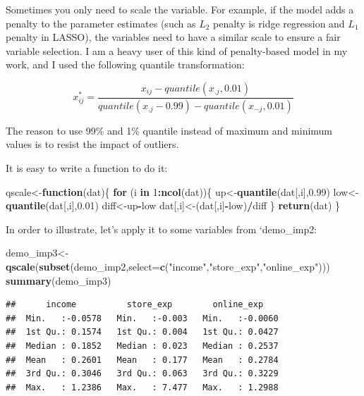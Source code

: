 \documentclass[12pt,]{krantz}
\newenvironment{Shaded}{\begin{snugshade}}{\end{snugshade}}
\newcommand{\KeywordTok}[1]{\textcolor[rgb]{0.13,0.29,0.53}{\textbf{#1}}}
\newcommand{\DataTypeTok}[1]{\textcolor[rgb]{0.13,0.29,0.53}{#1}}
\newcommand{\DecValTok}[1]{\textcolor[rgb]{0.00,0.00,0.81}{#1}}
\newcommand{\FloatTok}[1]{\textcolor[rgb]{0.00,0.00,0.81}{#1}}
\newcommand{\StringTok}[1]{\textcolor[rgb]{0.31,0.60,0.02}{#1}}
\newcommand{\ControlFlowTok}[1]{\textcolor[rgb]{0.13,0.29,0.53}{\textbf{#1}}}
\newcommand{\OperatorTok}[1]{\textcolor[rgb]{0.81,0.36,0.00}{\textbf{#1}}}
\newcommand{\NormalTok}[1]{#1}
\theoremstyle{definition}
\theoremstyle{definition}
\theoremstyle{definition}
\theoremstyle{remark}
\begin{document}
Sometimes you only need to scale the variable. For example, if the model
adds a penalty to the parameter estimates (such as \(L_2\) penalty is
ridge regression and \(L_1\) penalty in LASSO), the variables need to
have a similar scale to ensure a fair variable selection. I am a heavy
user of this kind of penalty-based model in my work, and I used the
following quantile transformation:

\[
x_{ij}^{*}=\frac{x_{ij}-quantile(x_{.j},0.01)}{quantile(x_{.j}-0.99)-quantile(x_{-j},0.01)}
\]

The reason to use 99\% and 1\% quantile instead of maximum and minimum
values is to resist the impact of outliers.

It is easy to write a function to do it:

\begin{Shaded}
\begin{Highlighting}[]
\NormalTok{qscale<-}\ControlFlowTok{function}\NormalTok{(dat)\{}
  \ControlFlowTok{for}\NormalTok{ (i }\ControlFlowTok{in} \DecValTok{1}\OperatorTok{:}\KeywordTok{ncol}\NormalTok{(dat))\{}
\NormalTok{    up<-}\KeywordTok{quantile}\NormalTok{(dat[,i],}\FloatTok{0.99}\NormalTok{)}
\NormalTok{    low<-}\KeywordTok{quantile}\NormalTok{(dat[,i],}\FloatTok{0.01}\NormalTok{)}
\NormalTok{    diff<-up}\OperatorTok{-}\NormalTok{low}
\NormalTok{    dat[,i]<-(dat[,i]}\OperatorTok{-}\NormalTok{low)}\OperatorTok{/}\NormalTok{diff}
\NormalTok{  \}}
  \KeywordTok{return}\NormalTok{(dat)}
\NormalTok{\}}
\end{Highlighting}
\end{Shaded}

In order to illustrate, let's apply it to some variables from
`demo\_imp2:

\begin{Shaded}
\begin{Highlighting}[]
\NormalTok{demo_imp3<-}\KeywordTok{qscale}\NormalTok{(}\KeywordTok{subset}\NormalTok{(demo_imp2,}\DataTypeTok{select=}\KeywordTok{c}\NormalTok{(}\StringTok{"income"}\NormalTok{,}\StringTok{"store_exp"}\NormalTok{,}\StringTok{"online_exp"}\NormalTok{)))}
\KeywordTok{summary}\NormalTok{(demo_imp3)}
\end{Highlighting}
\end{Shaded}

\begin{verbatim}
##      income          store_exp        online_exp     
##  Min.   :-0.0578   Min.   :-0.003   Min.   :-0.0060  
##  1st Qu.: 0.1574   1st Qu.: 0.004   1st Qu.: 0.0427  
##  Median : 0.1852   Median : 0.023   Median : 0.2537  
##  Mean   : 0.2601   Mean   : 0.177   Mean   : 0.2784  
##  3rd Qu.: 0.3046   3rd Qu.: 0.063   3rd Qu.: 0.3229  
##  Max.   : 1.2386   Max.   : 7.477   Max.   : 1.2988
\end{verbatim}
\end{document}
